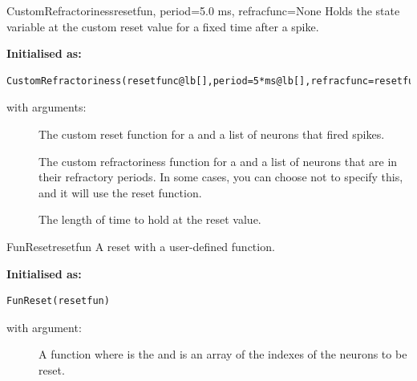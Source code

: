 \documentclass[letterpaper,10pt]{manual}
\begin{document}
\hypertarget{brian.CustomRefractoriness}{}\begin{classdesc}{CustomRefractoriness}{resetfun, period=5.0 ms, refracfunc=None}
Holds the state variable at the custom reset value for a fixed time after a spike.

\textbf{Initialised as:}

\begin{Verbatim}[commandchars=@\[\]]
CustomRefractoriness(resetfunc@lb[],period=5*ms@lb[],refracfunc=resetfunc@rb[]@rb[])
\end{Verbatim}

with arguments:
\begin{description}
\item[]
The custom reset function  for  a
\hyperlink{brian.NeuronGroup}{} and  a list of neurons that
fired spikes.

\item[]
The custom refractoriness function  for  a
\hyperlink{brian.NeuronGroup}{} and  a list of neurons that are in
their refractory periods. In some cases, you can choose not to specify this,
and it will use the reset function.

\item[]
The length of time to hold at the reset value.

\end{description}
\end{classdesc}


\hypertarget{brian.FunReset}{}\begin{classdesc}{FunReset}{resetfun}
A reset with a user-defined function.

\textbf{Initialised as:}

\begin{Verbatim}[commandchars=@\[\]]
FunReset(resetfun)
\end{Verbatim}

with argument:
\begin{description}
\item[]
A function  where  is the
\hyperlink{brian.NeuronGroup}{} and  is an array of
the indexes of the neurons to be reset.

\end{description}
\end{classdesc}
\end{document}
